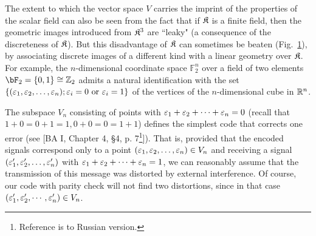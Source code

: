 The extent to which the vector space $V$ carries the imprint of the properties of the scalar field can also be seen from the fact that if ${\mathfrak{K}}$ is a finite field, then the geometric images introduced from ${\mathfrak{K}}^3$ are ``leaky" (a consequence of the discreteness of ${\mathfrak{K}}$). But this disadvantage of ${\mathfrak{K}}$ can sometimes be beaten (Fig.~\ref{fig:discrete-image}), by associating discrete images of a different kind with a linear geometry over ${\mathfrak{K}}$. For example, the $n$-dimensional coordinate space $\mathbb{F}_2^n$ over a field of two elements $\bF_2 =\{0,1\}\cong\bZ_2$ admits a natural identification with the set $\{(\varepsilon_1 ,\varepsilon_2 ,\dots ,\varepsilon_n ); \varepsilon_i =0 \text{ or } \varepsilon_i = 1\}$ of the vertices of the $n$-dimensional cube in ${\mathbb{R}}^n$.

\begin{figure}
	\label{fig:discrete-image}
	\caption{}
\end{figure}

The subspace $V_n$ consisting of points with $\varepsilon_1 +\varepsilon_2 + \dots + \varepsilon_n = 0$ (recall that $1 + 0 = 0 + 1 = 1, 0 + 0 = 0 = 1 + 1$) defines the simplest code that corrects one error (see [BA I, Chapter 4, \S4, p. 7\footnote{Reference is to Russian version.}]). That is, provided that the encoded signals correspond only to a point $(\varepsilon_1 ,\varepsilon_2 ,\dots ,\varepsilon_n )\in V_n$ and receiving a signal $(\varepsilon_1 ',\varepsilon_2 ',\dots ,\varepsilon_n ')$ with $\varepsilon_1 +\varepsilon_2 + \dots + \varepsilon_n = 1$, we can reasonably assume that the transmission of this message was distorted by external interference. Of course, our code with parity check will not find two distortions, since in that case $(\varepsilon_1 ',\varepsilon_2 ',\cdots ,\varepsilon_n ') \in V_n$.